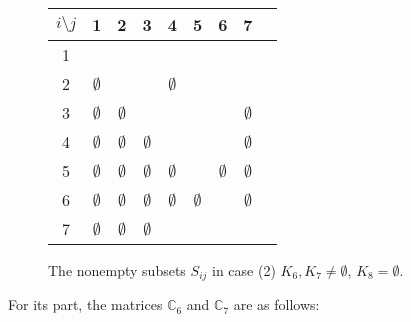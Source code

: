 \documentclass[12pt]{book}
\theoremstyle{plain}
\theoremstyle{remark}
\begin{document}
\begin{figure}[h!]	 
\begin{center}
	\begin{tabular}{ c | c c c c c c c c} 
		 \hline
		 $i\setminus j$ & 1 & 2 & 3 & 4 & 5 & 6 & 7 \\ 
		  \hline
		 1 & \checkmark & \checkmark & \checkmark & \checkmark & \checkmark & \checkmark & \checkmark \\ 
		 2 & $\emptyset$ & \checkmark & \checkmark & $\emptyset$ & \checkmark & \checkmark & \checkmark  \\
 		 3 & $\emptyset$ & $\emptyset$ & \checkmark & \checkmark & \checkmark & \checkmark & $\emptyset$  \\
		 4 & $\emptyset$ & $\emptyset$ & $\emptyset$ & \checkmark & \checkmark & \checkmark & $\emptyset$ \\
		 5 & $\emptyset$ & $\emptyset$ & $\emptyset$ & $\emptyset$ & \checkmark & $\emptyset$ & $\emptyset$ \\
		 6 & $\emptyset$  & $\emptyset$  & $\emptyset$  & $\emptyset$  & $\emptyset$ & \checkmark & $\emptyset$ \\
		7 & $\emptyset$ & $\emptyset$ & $\emptyset$ & \checkmark & \checkmark & \checkmark & \checkmark \\
	\end{tabular}
\end{center} 
\caption{The nonempty subsets $S_{ij}$ in case (2) $K_6, K_7 \neq \emptyset$, $K_8 = \emptyset$.} \label{fig:tabla_co4tent_2}
\end{figure}

For its part, the matrices $\mathbb C_6$ and $\mathbb C_7$ are as follows:
                
\end{document}
